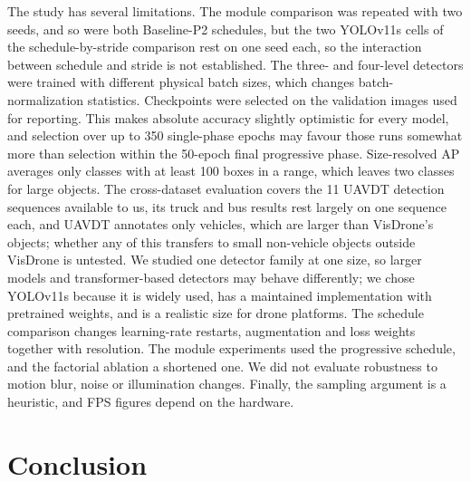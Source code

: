 \documentclass[preprint,12pt]{elsarticle}
\begin{document}
The study has several limitations. The module comparison was repeated with two
seeds, and so were both Baseline-P2 schedules, but the two YOLOv11s cells of the
schedule-by-stride comparison rest on one seed each, so the interaction between
schedule and stride is not established. The three- and four-level detectors were
trained with different physical batch sizes, which changes batch-normalization
statistics. Checkpoints were selected on the validation images used for reporting.
This makes absolute accuracy slightly optimistic for every model, and selection
over up to 350 single-phase epochs may favour those runs somewhat more than
selection within the 50-epoch final progressive phase. Size-resolved AP averages
only classes with at least 100 boxes in a range, which leaves two classes for large
objects. The cross-dataset evaluation covers the 11 UAVDT detection sequences
available to us, its truck and bus results rest largely on one sequence each, and
UAVDT annotates only vehicles, which are larger than VisDrone's objects; whether any
of this transfers to small non-vehicle objects outside VisDrone is untested. We studied one
detector family at one size, so larger models and transformer-based detectors may
behave differently; we chose YOLOv11s because it is widely used, has a maintained
implementation with pretrained weights, and is a realistic size for drone
platforms. The schedule comparison changes learning-rate restarts, augmentation
and loss weights together with resolution. The module experiments used the
progressive schedule, and the factorial ablation a shortened one. We did not
evaluate robustness to motion blur, noise or illumination changes. Finally, the
sampling argument is a heuristic, and FPS figures depend on the hardware.

\section{Conclusion}
\label{sec:conclusion}
\end{document}
